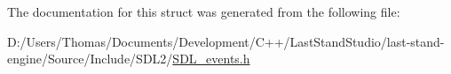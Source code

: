 The documentation for this struct was generated from the following file\+:\begin{DoxyCompactItemize}
\item 
D\+:/\+Users/\+Thomas/\+Documents/\+Development/\+C++/\+Last\+Stand\+Studio/last-\/stand-\/engine/\+Source/\+Include/\+S\+D\+L2/\hyperlink{SDL__events_8h}{S\+D\+L\+\_\+events.\+h}\end{DoxyCompactItemize}
